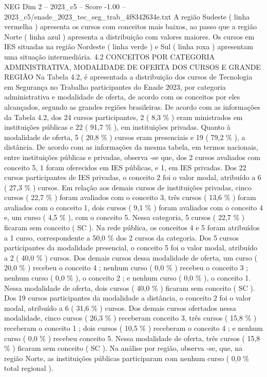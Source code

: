 \begin{textsample}{NEG Dim 2 – 2023\_c5 – Score -1.00 – 2023\_c5/enade\_2023\_tec\_seg\_trab\_4f8342634e.txt}
A região Sudeste ( linha vermelha ) apresenta os cursos com conceitos mais baixos, ao passo que a região Norte ( linha azul ) apresenta a distribuição com valores maiores.
Os cursos em IES situadas na região Nordeste ( linha verde ) e Sul ( linha roxa ) apresentam uma situação intermediária. 4.2 CONCEITOS POR CATEGORIA ADMINISTRATIVA, MODALIDADE DE OFERTA DOS CURSOS E GRANDE REGIÃO Na Tabela 4.2, é apresentada a distribuição dos cursos de Tecnologia em Segurança no Trabalho participantes do Enade 2023, por categoria administrativa e modalidade de oferta, de acordo com os conceitos por eles alcançados, segundo as grandes regiões brasileiras.
De acordo com as informações da Tabela 4.2, dos 24 cursos participantes, 2 ( 8,3 \% ) eram ministrados em instituições públicas e 22 ( 91,7 \% ), em instituições privadas.
Quanto à modalidade de oferta, 5 ( 20,8 \% ) cursos eram presenciais e 19 ( 79,2 \% ), a distância.
De acordo com as informações da mesma tabela, em termos nacionais, entre instituições públicas e privadas, observa -se que, dos 2 cursos avaliados com conceito 5, 1 foram oferecidos em IES públicas, e 1, em IES privadas.
Dos 22 cursos participantes de IES privadas, o conceito 2 foi o valor modal, atribuído a 6 ( 27,3 \% ) cursos.
Em relação aos demais cursos de instituições privadas, cinco cursos ( 22,7 \% ) foram avaliados com o conceito 3, três cursos ( 13,6 \% ) foram avaliados com o conceito 1, dois cursos ( 9,1 \% ) foram avaliados com o conceito 4 e, um curso ( 4,5 \% ), com o conceito 5.
Nessa categoria, 5 cursos ( 22,7 \% ) ficaram sem conceito ( SC ).
Na rede pública, os conceitos 4 e 5 foram atribuídos a 1 curso, correspondente a 50,0 \% dos 2 cursos da categoria.
Dos 5 cursos participantes da modalidade presencial, o conceito 5 foi o valor modal, atribuído a 2 ( 40,0 \% ) cursos.
Dos demais cursos dessa modalidade de oferta, um curso ( 20,0 \% ) recebeu o conceito 4 ; nenhum curso ( 0,0 \% ) recebeu o conceito 3 ; nenhum curso ( 0,0 \% ), o conceito 2 ; e nenhum curso ( 0,0 \% ), o conceito 1.
Nessa modalidade de oferta, dois cursos ( 40,0 \% ) ficaram sem conceito ( SC ).
Dos 19 cursos participantes da modalidade a distância, o conceito 2 foi o valor modal, atribuído a 6 ( 31,6 \% ) cursos.
Dos demais cursos ofertados nessa modalidade, cinco cursos ( 26,3 \% ) receberam conceito 3, três cursos ( 15,8 \% ) receberam o conceito 1 ; dois cursos ( 10,5 \% ) receberam o conceito 4 ; e nenhum curso ( 0,0 \% ) recebeu conceito 5.
Nessa modalidade de oferta, três cursos ( 15,8 \% ) ficaram sem conceito ( SC ).
Na análise por região, observa -se, que, na região Norte, as instituições públicas participaram com nenhum curso ( 0,0 \% total regional ).

\end{textsample}
